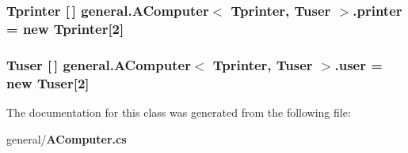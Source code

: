 \subsubsection[{printer}]{\setlength{\rightskip}{0pt plus 5cm}Tprinter [$\,$] general.\-A\-Computer$<$ Tprinter, Tuser $>$.printer = new Tprinter[2]}\label{classgeneral_1_1_a_computer_3_01_tprinter_00_01_tuser_01_4_a2958528912a8e54a2996e34c7dff0f17}
\subsubsection[{user}]{\setlength{\rightskip}{0pt plus 5cm}Tuser [$\,$] general.\-A\-Computer$<$ Tprinter, Tuser $>$.user = new Tuser[2]}\label{classgeneral_1_1_a_computer_3_01_tprinter_00_01_tuser_01_4_a01d747a58d08f2074b8960c5293875fc}


The documentation for this class was generated from the following file\-:\begin{DoxyCompactItemize}
\item 
general/{\bf A\-Computer.\-cs}\end{DoxyCompactItemize}
